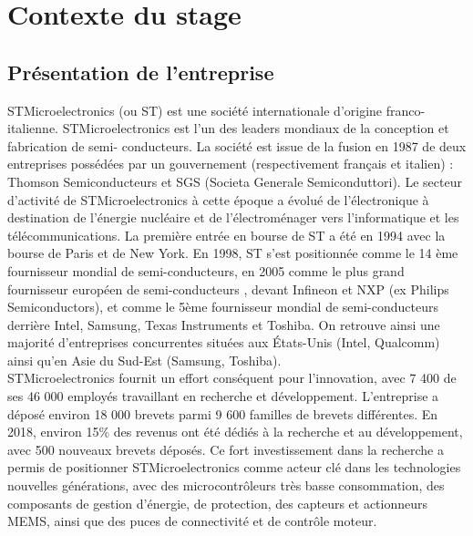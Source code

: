 
\section{Contexte du stage}
\label{chp:part1:context}

\subsection{Présentation de l'entreprise}
\label{chp:part1:presentation_company}

STMicroelectronics (ou ST) est une société internationale d’origine
franco-italienne.  STMicroelectronics est l’un des leaders mondiaux de la
conception et fabrication de semi- conducteurs.  La société est issue de la
fusion en 1987 de deux entreprises possédées par un gouvernement
(respectivement français et italien) : Thomson Semiconducteurs et SGS
(Societa Generale Semiconduttori). Le secteur d’activité de STMicroelectronics
à cette époque a évolué de l’électronique à destination de l’énergie nucléaire
et de l’électroménager vers l’informatique et les télécommunications.  La
première entrée en bourse de ST a été en 1994 avec la bourse de Paris et de
New York.  En 1998, ST s’est positionnée comme le 14 ème fournisseur mondial de
semi-conducteurs, en 2005 comme le plus grand fournisseur européen de semi-conducteurs
, devant Infineon et NXP (ex Philips Semiconductors), et comme le 5ème
fournisseur mondial de semi-conducteurs derrière Intel, Samsung, Texas
Instruments et Toshiba. On retrouve ainsi une majorité d'entreprises
concurrentes situées aux États-Unis (Intel, Qualcomm) ainsi qu'en Asie du
Sud-Est (Samsung, Toshiba). \\

STMicroelectronics fournit un effort conséquent pour l’innovation, avec 7 400
de ses 46 000 employés travaillant en recherche et développement.
L’entreprise a déposé environ 18 000 brevets parmi 9 600 familles de brevets
différentes.  En 2018, environ 15\% des revenus ont été dédiés à la recherche
et au développement, avec 500 nouveaux brevets déposés.  Ce fort
investissement dans la recherche a permis de positionner STMicroelectronics
comme acteur clé dans les technologies nouvelles générations, avec des
microcontrôleurs très basse consommation, des composants de gestion d’énergie,
de protection, des capteurs et actionneurs MEMS, ainsi que des puces de
connectivité et de contrôle moteur. \\

